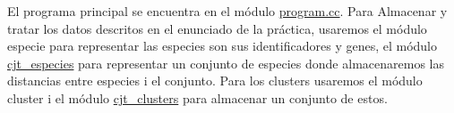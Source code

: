 El programa principal se encuentra en el módulo \mbox{\hyperlink{program_8cc}{program.\+cc}}. Para Almacenar y tratar los datos descritos en el enunciado de la práctica, usaremos el módulo especie para representar las especies son sus identificadores y genes, el módulo \mbox{\hyperlink{classcjt__especies}{cjt\+\_\+especies}} para representar un conjunto de especies donde almacenaremos las distancias entre especies i el conjunto. Para los clusters usaremos el módulo cluster i el módulo \mbox{\hyperlink{classcjt__clusters}{cjt\+\_\+clusters}} para almacenar un conjunto de estos. 